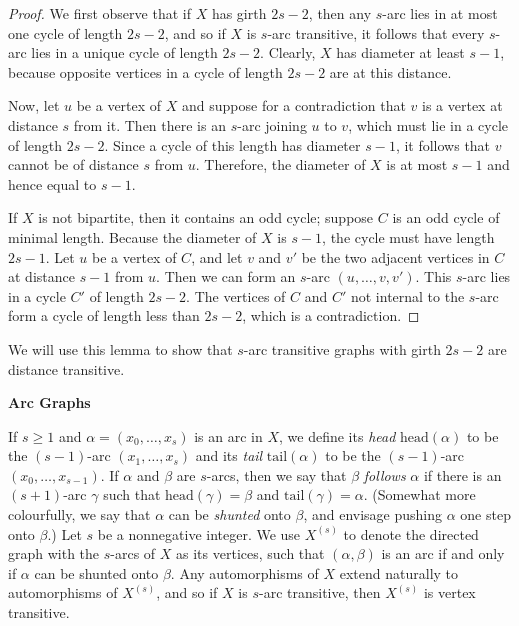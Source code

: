 \documentclass[12pt,a4paper,openany]{book}
\begin{document}
\begin{proof}
We first observe that if $X$ has girth $2s - 2$, then any $s$-arc lies in at most one cycle of length $2s - 2$, and so if $X$ is $s$-arc transitive, it follows that every $s$-arc lies in a unique cycle of length $2s - 2$. Clearly, $X$ has diameter at least $s - 1$, because opposite vertices in a cycle of length $2s - 2$ are at this distance. 

Now, let $u$ be a vertex of $X$ and suppose for a contradiction that $v$ is a vertex at distance $s$ from it. Then there is an $s$-arc joining $u$ to $v$, which must lie in a cycle of length $2s - 2$. Since a cycle of this length has diameter $s - 1$, it follows that $v$ cannot be of distance $s$ from $u$. Therefore, the diameter of $X$ is at most $s - 1$ and hence equal to $s - 1$.

If $X$ is not bipartite, then it contains an odd cycle; suppose $C$ is an odd cycle of minimal length. Because the diameter of $X$ is $s-1$, the cycle must have length $2s - 1$. Let $u$ be a vertex of $C$, and let $v$ and $v'$ be the two adjacent vertices in $C$ at distance $s - 1$ from $u$. Then we can form an $s$-arc $(u, \ldots, v, v')$. This $s$-arc lies in a cycle $C'$ of length $2s - 2$. The vertices of $C$ and $C'$ not internal to the $s$-arc form a cycle of length less than $2s - 2$, which is a contradiction.
\end{proof}

We will use this lemma to show that $s$-arc transitive graphs with girth $2s - 2$ are distance transitive.


\noindent\textbf{Arc Graphs}

If $s \geq 1$ and $\alpha = (x_0, \dots, x_s)$ is an arc in $X$, we define its \emph{head} $\text{head}(\alpha)$ 
to be the $(s - 1)$-arc $(x_1, \dots, x_s)$ and its \emph{tail} $\text{tail}(\alpha)$ to be the $(s - 1)$-arc 
$(x_0, \dots, x_{s-1})$. If $\alpha$ and $\beta$ are $s$-arcs, then we say that $\beta$ \emph{follows} $\alpha$ if there 
is an $(s+1)$-arc $\gamma$ such that $\text{head}(\gamma) = \beta$ and $\text{tail}(\gamma) = \alpha$. (Somewhat more 
colourfully, we say that $\alpha$ can be \emph{shunted} onto $\beta$, and envisage pushing $\alpha$ 
one step onto $\beta$.) Let $s$ be a nonnegative integer. We use $X^{(s)}$ to denote 
the directed graph with the $s$-arcs of $X$ as its vertices, such that $(\alpha, \beta)$ is 
an arc if and only if $\alpha$ can be shunted onto $\beta$. Any automorphisms of $X$ 
extend naturally to automorphisms of $X^{(s)}$, and so if $X$ is $s$-arc transitive, 
then $X^{(s)}$ is vertex transitive.
\end{document}
